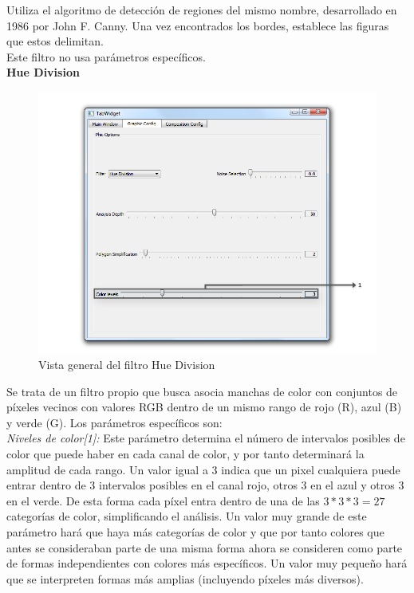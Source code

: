 		Utiliza el algoritmo de detección de regiones del mismo nombre, desarrollado en 1986 por John F. Canny. Una vez encontrados los bordes, establece las figuras que estos delimitan.\\
		
		Este filtro no usa parámetros específicos.\\
		
	\noindent\textbf{Hue Division}\\

		\begin{figure}[htbp]
		\centering
		\hspace*{-0.9in}
		\includegraphics[scale=0.57]{graphics/interfazhue.png}
		\caption{Vista general del filtro Hue Division}
		\label{fig:interfazhue}
		\end{figure}

		Se trata de un filtro propio que busca asocia manchas de color con conjuntos de píxeles vecinos con valores RGB dentro de un mismo rango de rojo (R), azul (B) y verde (G). Los parámetros específicos son:\\
		
		\noindent\textit{Niveles de color[1]:} Este parámetro determina el número de intervalos posibles de color que puede haber en cada canal de color, y por tanto determinará la amplitud de cada rango. Un valor igual a 3 indica que un pixel cualquiera puede entrar dentro de 3 intervalos posibles en el canal rojo, otros 3 en el azul y otros 3 en el verde. De esta forma cada píxel entra dentro de una de las $3*3*3=27$ categorías de color, simplificando el análisis. Un valor muy grande de este parámetro hará que haya más categorías de color y que por tanto colores que antes se consideraban parte de una misma forma ahora se consideren como parte de formas independientes con colores más específicos. Un valor muy pequeño hará que se interpreten formas más amplias (incluyendo píxeles más diversos).\\
		
